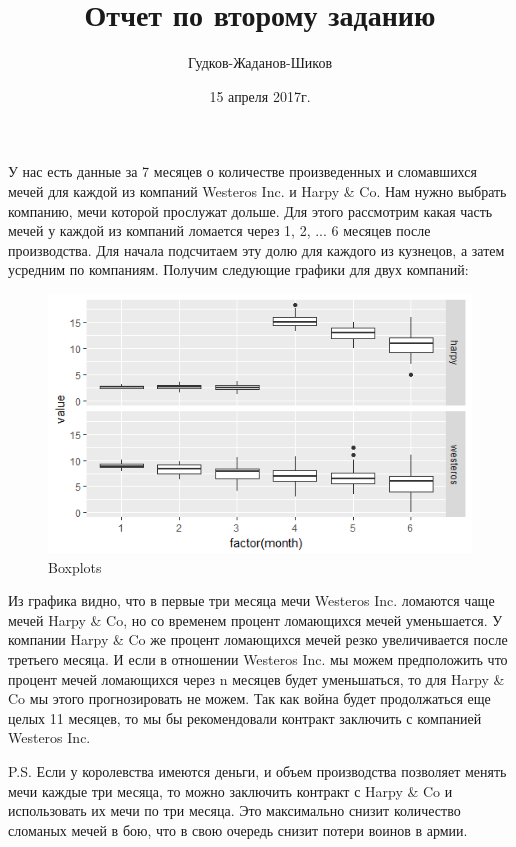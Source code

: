 \documentclass{beamer}
\title{Отчет по второму заданию}
\author{Гудков-Жаданов-Шиков}
\date{15 апреля 2017г.}
\begin{document}
\maketitle

\begin{frame}{} 
У нас есть данные за 7 месяцев о количестве произведенных и сломавшихся мечей для каждой из компаний Westeros Inc. и Harpy \& Co. Нам нужно выбрать компанию, мечи которой прослужат дольше. Для этого рассмотрим какая часть мечей у каждой из компаний ломается через 1, 2, ... 6 месяцев после производства. Для начала подсчитаем эту долю для каждого из кузнецов, а затем усредним по компаниям. 
Получим следующие графики для двух компаний:
\end{frame}
\begin{figure}[h!]
\centering
\includegraphics[scale=0.8]{grafik.png}
\caption{Boxplots}
\label{fig:univerise}
\end{figure}
\begin{frame}{} 
Из графика видно, что в первые три месяца мечи Westeros Inc. ломаются чаще мечей Harpy \& Co, но со временем процент ломающихся мечей уменьшается. У компании Harpy \& Co же процент ломающихся мечей резко увеличивается после третьего месяца. И если в отношении Westeros Inc. мы можем предположить что процент мечей ломающихся через n месяцев будет уменьшаться, то для Harpy \& Co мы этого прогнозировать не можем. Так как война будет продолжаться еще целых 11 месяцев, то мы бы рекомендовали контракт заключить с компанией Westeros Inc.
\end{frame}
\begin{frame}
P.S. Если у королевства имеются деньги, и объем производства позволяет менять мечи каждые три месяца, то можно заключить контракт с Harpy \& Co и использовать их мечи по три месяца. Это максимально снизит количество сломаных мечей в бою, что в свою очередь снизит потери воинов в армии.
\end{frame}
\end{document}
